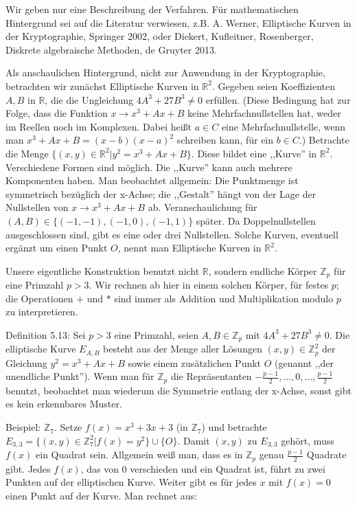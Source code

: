 \documentclass[a4paper]{article}
\begin{document}
\begin{multicols}{3}
    Wir geben nur eine Beschreibung der Verfahren. Für mathematischen Hintergrund sei auf die Literatur verwiesen, z.B. A. Werner, Elliptische Kurven in der Kryptographie, Springer 2002, oder Diekert, Kufleitner, Rosenberger, Diskrete algebraische Methoden, de Gruyter 2013.

    Als anschaulichen Hintergrund, nicht zur Anwendung in der Kryptographie, betrachten wir zunächst Elliptische Kurven in $\mathbb{R}^2$. Gegeben seien Koeffizienten $A, B$ in $\mathbb{R}$, die die Ungleichung $4A^3+ 27B^3 \not= 0$ erfüllen. (Diese Bedingung hat zur Folge, dass die Funktion $x\rightarrow x^3+Ax+B$ keine Mehrfachnullstellen hat, weder im Reellen noch im Komplexen. Dabei heißt $a\in C$ eine Mehrfachnullstelle, wenn man $x^3+Ax+B= (x-b)(x-a)^2$ schreiben kann, für ein $b\in C$.) Betrachte die Menge $\{(x,y)\in\mathbb{R}^2| y^2=x^3+Ax+B\}$.
    Diese bildet eine ,,Kurve'' in $\mathbb{R}^2$. Verschiedene Formen sind möglich. Die ,,Kurve'' kann auch mehrere Komponenten haben. Man beobachtet allgemein: Die Punktmenge ist symmetrisch bezüglich der x-Achse; die ,,Gestalt'' hängt von der Lage der Nullstellen von $x\rightarrow x^3+Ax+B$ ab. Veranschaulichung für $(A,B)\in\{(- 1 ,-1),(- 1 ,0),(- 1 ,1)\}$ später. Da Doppelnullstellen ausgeschlossen sind, gibt es eine oder drei Nullstellen.
    Solche Kurven, eventuell ergänzt um einen Punkt $O$, nennt man Elliptische Kurven in $\mathbb{R}^2$.

    Unsere eigentliche Konstruktion benutzt nicht $\mathbb{R}$, sondern endliche Körper $\mathbb{Z}_p$ für eine Primzahl $p>3$. Wir rechnen ab hier in einem solchen Körper, für festes $p$; die Operationen $+$ und $*$ sind immer als Addition und Multiplikation modulo $p$ zu interpretieren.

    Definition 5.13: Sei $p >3$ eine Primzahl, seien $A,B\in\mathbb{Z}_p$ mit $4A^3+ 27B^3 \not= 0$. Die elliptische Kurve $E_{A,B}$ besteht aus der Menge aller Lösungen $(x,y)\in\mathbb{Z}^2_p$ der Gleichung $y^2=x^3+Ax+B$ sowie einem zusätzlichen Punkt $O$ (genannt ,,der unendliche Punkt'').
    Wenn man für $\mathbb{Z}_p$ die Repräsentanten $-\frac{p-1}{2},..., 0 , ...,\frac{p-1}{2}$ benutzt, beobachtet man wiederum die Symmetrie entlang der x-Achse, sonst gibt es kein erkennbares Muster.

    Beispiel: $\mathbb{Z}_7$. Setze $f(x)=x^3+ 3x+ 3$ (in $\mathbb{Z}_7$) und betrachte $E_{3,3}=\{(x,y)\in\mathbb{Z}^2_7 | f(x)=y^2\}\cup \{O\}$. Damit $(x,y)$ zu $E_{3,3}$ gehört, muss $f(x)$ ein Quadrat sein. Allgemein weiß man, dass es in $\mathbb{Z}_p$ genau $\frac{p-1}{2}$ Quadrate gibt. Jedes $f(x)$, das von $0$ verschieden und ein Quadrat ist, führt zu zwei Punkten auf der elliptischen Kurve. Weiter gibt es für jedes $x$ mit $f(x) = 0$ einen Punkt auf der Kurve. Man rechnet aus:


\end{multicols}
\end{document}
